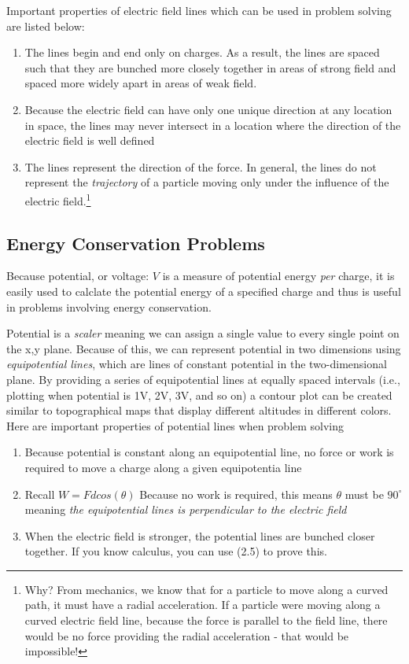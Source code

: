 Important properties of electric field lines which can be used in problem solving are listed below:
\begin{enumerate}
    \item The lines begin and end only on charges. As a result, the lines are spaced such that they are bunched more closely together in areas of strong field and spaced more widely apart in areas of weak field.
    \item Because the electric field can have only one unique direction at any location in space, the lines may never intersect in a location where the direction of the electric field is well defined
    \item The lines represent the direction of the force. In general, the lines do not represent the \emph{trajectory} of a particle moving only under the influence of the electric field.\footnote{Why? From mechanics, we know that for a particle to move along a curved path, it must have a radial acceleration. If a particle were moving along a curved electric field line, because the force is parallel to the field line, there would be no force providing the radial acceleration - that would be impossible!}
\end{enumerate}

\newpage
\subsection{Energy Conservation Problems}
Because potential, or voltage: $V$ is a measure of potential energy \emph{per} charge, it is easily used to calclate the potential energy of a specified charge and thus is useful in problems involving energy conservation.

Potential is a \emph{scaler} meaning we can assign a single value to every single point on the x,y plane. Because of this, we can represent potential in two dimensions using \emph{equipotential lines}, which are lines of constant potential in the two-dimensional plane. By providing a series of equipotential lines at equally spaced intervals (i.e., plotting when potential is 1V, 2V, 3V, and so on) a contour plot can be created similar to topographical maps that display different altitudes in different colors. Here are important properties of potential lines when problem solving
\begin{enumerate}
    \item Because potential is constant along an equipotential line, no force or work is required to move a charge along a given equipotentia line
    \item Recall $W=Fdcos(\theta)$ Because no work is required, this means $\theta$ must be $90^\circ$ meaning \emph{the equipotential lines is perpendicular to the electric field}
    \item When the electric field is stronger, the potential lines are bunched closer together. If you know calculus, you can use (2.5) to prove this.
\end{enumerate}

